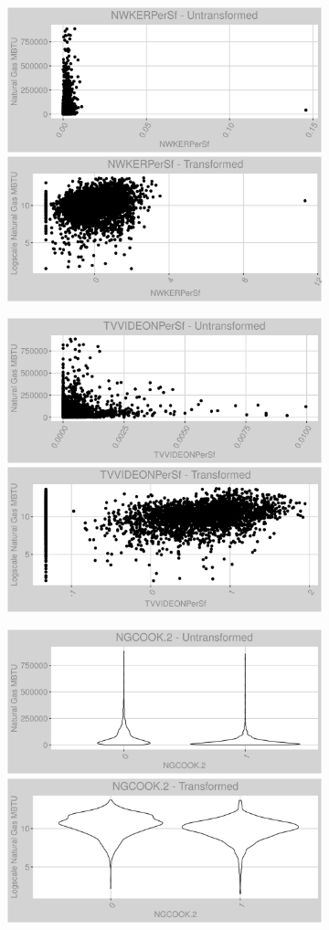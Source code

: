 \FloatBarrier
\newpage
\begin{figure}
\centering
\begin{subfigure}{1\textwidth}
\centering
\includegraphics[width=.49\textwidth, height=0.3\textheight]{Images/natural_gas_psf_var_original_6.png}
\includegraphics[width=.49\textwidth, height=0.3\textheight]{Images/natural_gas_psf_var_transformed_6.png}
\end{subfigure}
\begin{subfigure}{1\textwidth}
\centering
\includegraphics[width=.49\textwidth, height=0.3\textheight]{Images/natural_gas_psf_var_original_7.png}
\includegraphics[width=.49\textwidth, height=0.3\textheight]{Images/natural_gas_psf_var_transformed_7.png}
\end{subfigure}
\begin{subfigure}{1\textwidth}
\centering
\includegraphics[width=.49\textwidth, height=0.3\textheight]{Images/natural_gas_psf_var_original_8.png}
\includegraphics[width=.49\textwidth, height=0.3\textheight]{Images/natural_gas_psf_var_transformed_8.png}
\end{subfigure}
\end{figure}
